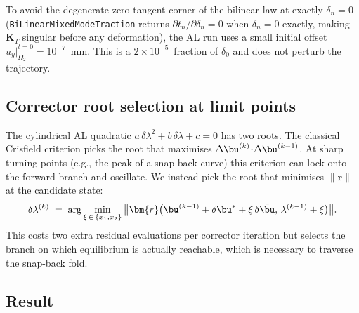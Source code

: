 To avoid the degenerate zero-tangent corner of the bilinear law at exactly
$\delta_n = 0$ (\texttt{BiLinearMixedModeTraction} returns
$\partial t_n/\partial \delta_n = 0$ when $\delta_n = 0$ exactly, making
$\bm{K}_T$ singular before any deformation), the AL run uses a small
initial offset $u_y\big|_{\Omega_2}^{t=0} = 10^{-7}$~mm. This is a
$2\times 10^{-5}$~fraction of $\delta_0$ and does not perturb the
trajectory.

\subsection{Corrector root selection at limit points}

The cylindrical AL quadratic
$a\,\delta\lambda^2 + b\,\delta\lambda + c = 0$ has two roots. The classical
Crisfield criterion picks the root that maximises
$\Delta\bu^{(k)} \!\cdot\! \Delta\bu^{(k-1)}$. At sharp turning points
(e.g., the peak of a snap-back curve) this criterion can lock onto the
forward branch and oscillate. We instead pick the root that minimises
$\|\bm{r}\|$ at the candidate state:
\begin{equation}
\delta\lambda^{(k)} \;=\; \arg\min_{\xi\,\in\,\{x_1, x_2\}}\,
\bigl\|\bm{r}\bigl(\bu^{(k-1)} + \delta\bu^{*} + \xi\,\delta\bar{\bu},\,
                   \lambda^{(k-1)} + \xi\bigr)\bigr\|.
\end{equation}
This costs two extra residual evaluations per corrector iteration but
selects the branch on which equilibrium is actually reachable, which is
necessary to traverse the snap-back fold.

\subsection{Result}

